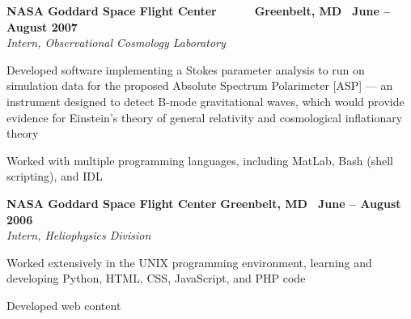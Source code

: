 \documentclass[10pt]{article}
\newcommand{\leftandright}[2]{\noindent\textbf{#1}\hfill
\textbf{#2}}
\begin{document}
\leftandright{NASA Goddard Space Flight Center }{ }
\leftandright{\textcolor{white}{space} }{Greenbelt, MD \textbullet\, June -- August 2007}\\  
\vspace{-0.8em}
\textit{Intern, Observational Cosmology Laboratory} 
\begin{itemize*}
  \item Developed software implementing a Stokes parameter analysis to
    run on simulation data for the proposed Absolute Spectrum
    Polarimeter [ASP] --- an instrument designed to detect B-mode
    gravitational waves, which would provide evidence for Einstein's
    theory of general relativity and cosmological inflationary theory
  \item Worked with multiple programming languages, including MatLab,
    Bash (shell scripting), and IDL 
\end{itemize*}


\leftandright{NASA Goddard Space Flight Center}{Greenbelt, MD \textbullet\, June -- August 2006}\\  
\vspace{-0.8em}
\textit{Intern,  Heliophysics Division}
\begin{itemize*}
  \item Worked extensively in the UNIX programming environment, learning and
    developing Python, HTML, CSS, JavaScript, and PHP code
  \item Developed web content  %
\end{itemize*}
\end{document}
